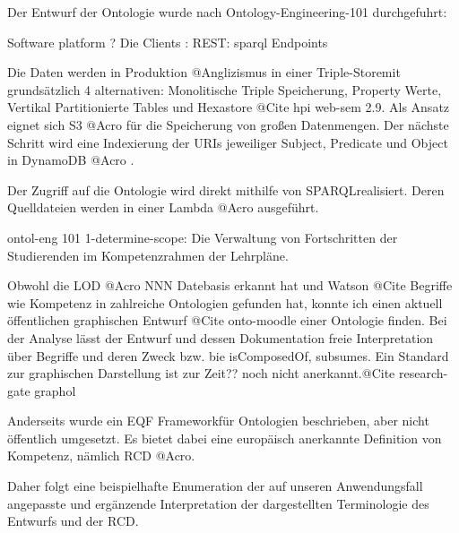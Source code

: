 \documentclass[
12pt,
english,
ngerman,
headsepline,
twoside,
openright,
numbers=noenddot,version=first
]{scrreprt}
\begin{document}
Der Entwurf der Ontologie wurde nach Ontology-Engineering-101 durchgefuhrt: 


Software platform ? 
Die Clients : REST: sparql Endpoints

Die Daten werden in Produktion @Anglizismus in einer \glqq Triple-Store\grqq mit grundsätzlich 4 alternativen: Monolitische Triple Speicherung, Property Werte, Vertikal Partitionierte Tables und Hexastore @Cite hpi web-sem 2.9. 
Als Ansatz eignet sich S3 @Acro für die Speicherung von großen Datenmengen. Der nächste Schritt wird eine Indexierung der URIs jeweiliger Subject, Predicate und Object in DynamoDB @Acro .

Der Zugriff auf die Ontologie wird direkt mithilfe von \glqq SPARQL\grqq  realisiert. Deren Quelldateien werden in einer Lambda @Acro ausgeführt.

ontol-eng 101
1-determine-scope: 
Die Verwaltung von Fortschritten der Studierenden im Kompetenzrahmen der Lehrpläne.

Obwohl die LOD @Acro NNN Datebasis erkannt hat und Watson @Cite Begriffe wie Kompetenz in zahlreiche Ontologien gefunden hat, konnte ich einen aktuell öffentlichen graphischen Entwurf @Cite onto-moodle einer Ontologie finden. 
Bei der Analyse lässt der Entwurf und dessen Dokumentation freie Interpretation über Begriffe und deren Zweck bzw. bie \glqq isComposedOf\grqq, \glqq subsumes\grqq. Ein Standard zur graphischen Darstellung ist zur Zeit?? noch nicht anerkannt.@Cite research-gate graphol

Anderseits wurde ein \glqq EQF Framework\grqq für Ontologien beschrieben, aber nicht öffentlich umgesetzt. Es bietet dabei eine europäisch anerkannte Definition von Kompetenz, nämlich RCD @Acro.

Daher folgt eine beispielhafte Enumeration der auf unseren Anwendungsfall angepasste und ergänzende Interpretation der dargestellten Terminologie des Entwurfs und der RCD.
\end{document}

